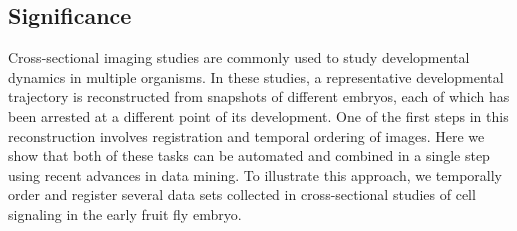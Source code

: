 \documentclass{pnastwo}
\begin{document}
\begin{article}
\section{Significance}
Cross-sectional imaging studies are commonly used to study developmental dynamics in multiple organisms. 
%
In these studies, a representative developmental trajectory is reconstructed from snapshots of different embryos, each of which has been arrested at a different point of its development. 
%
One of the first steps in this reconstruction involves registration and temporal ordering of images. 
%
Here we show that both of these tasks can be automated and combined in a single step using recent advances in data mining. 
%
To illustrate this approach, we temporally order and register several data sets collected in cross-sectional studies of cell signaling in the early fruit fly embryo.
\vspace{0.5cm}







\end{article}
\end{document}
